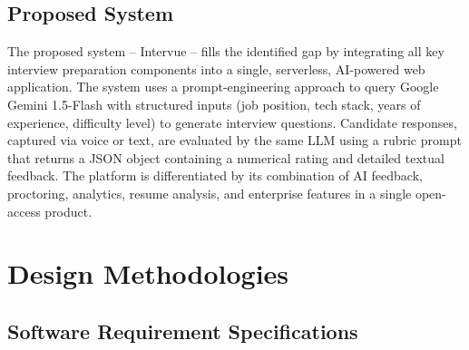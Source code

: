 \documentclass{fisatprojectfinal}
\begin{document}
\section{Proposed System}
The proposed system -- Intervue -- fills the identified gap by integrating all key interview
preparation components into a single, serverless, AI-powered web application. The system uses
a prompt-engineering approach to query Google Gemini 1.5-Flash with structured inputs (job
position, tech stack, years of experience, difficulty level) to generate interview questions.
Candidate responses, captured via voice or text, are evaluated by the same LLM using a rubric
prompt that returns a JSON object containing a numerical rating and detailed textual feedback.
The platform is differentiated by its combination of AI feedback, proctoring, analytics,
resume analysis, and enterprise features in a single open-access product.

\chapter{Design Methodologies}

\section{Software Requirement Specifications}
\end{document}
